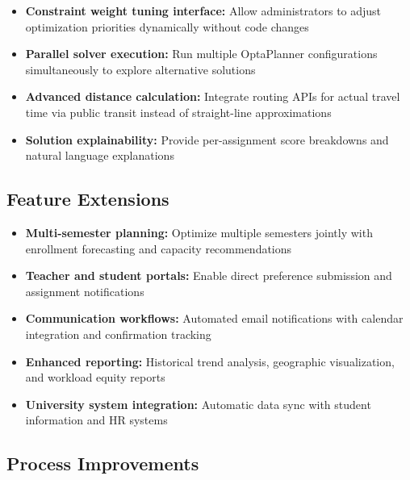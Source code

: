\documentclass[12pt,a4paper]{report}
\begin{document}
\begin{itemize}
    \item \textbf{Constraint weight tuning interface:} Allow administrators to adjust optimization priorities dynamically without code changes
    
    \item \textbf{Parallel solver execution:} Run multiple OptaPlanner configurations simultaneously to explore alternative solutions
    
    \item \textbf{Advanced distance calculation:} Integrate routing APIs for actual travel time via public transit instead of straight-line approximations
    
    \item \textbf{Solution explainability:} Provide per-assignment score breakdowns and natural language explanations
\end{itemize}

\subsection{Feature Extensions}

\begin{itemize}
    \item \textbf{Multi-semester planning:} Optimize multiple semesters jointly with enrollment forecasting and capacity recommendations
    
    \item \textbf{Teacher and student portals:} Enable direct preference submission and assignment notifications
    
    \item \textbf{Communication workflows:} Automated email notifications with calendar integration and confirmation tracking
    
    \item \textbf{Enhanced reporting:} Historical trend analysis, geographic visualization, and workload equity reports
    
    \item \textbf{University system integration:} Automatic data sync with student information and HR systems
\end{itemize}

\subsection{Process Improvements}
\end{document}
